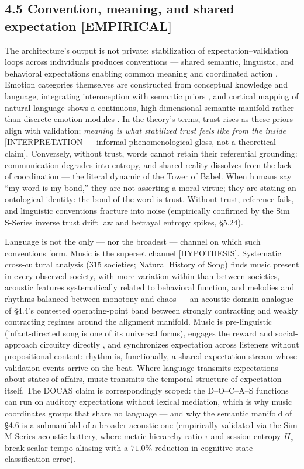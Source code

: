 \documentclass[
]{article}
\begin{document}
\subsection{4.5 Convention, meaning, and shared expectation
{[}EMPIRICAL{]}}\label{convention-meaning-and-shared-expectation-empirical}

The architecture's output is not private: stabilization of
expectation--validation loops across individuals produces conventions
--- shared semantic, linguistic, and behavioral expectations enabling
common meaning and coordinated action . Emotion categories themselves
are constructed from conceptual knowledge and language, integrating
interoception with semantic priors , and cortical mapping of natural
language shows a continuous, high-dimensional semantic manifold rather
than discrete emotion modules . In the theory's terms, trust rises as
these priors align with validation; \emph{meaning is what stabilized
trust feels like from the inside} {[}INTERPRETATION --- informal
phenomenological gloss, not a theoretical claim{]}. Conversely, without
trust, words cannot retain their referential grounding: communication
degrades into entropy, and shared reality dissolves from the lack of
coordination --- the literal dynamic of the Tower of Babel. When humans
say ``my word is my bond,'' they are not asserting a moral virtue; they
are stating an ontological identity: the bond of the word is trust.
Without trust, reference fails, and linguistic conventions fracture into
noise (empirically confirmed by the Sim S-Series inverse trust drift law
and betrayal entropy spikes, §5.24).

Language is not the only --- nor the broadest --- channel on which such
conventions form. Music is the superset channel {[}HYPOTHESIS{]}.
Systematic cross-cultural analysis (315 societies; Natural History of
Song) finds music present in every observed society, with more variation
within than between societies, acoustic features systematically related
to behavioral function, and melodies and rhythms balanced between
monotony and chaos --- an acoustic-domain analogue of §4.4's contested
operating-point band between strongly contracting and weakly contracting
regimes around the alignment manifold. Music is pre-linguistic
(infant-directed song is one of its universal forms), engages the reward
and social-approach circuitry directly , and synchronizes expectation
across listeners without propositional content: rhythm is, functionally,
a shared expectation stream whose validation events arrive on the beat.
Where language transmits expectations about states of affairs, music
transmits the temporal structure of expectation itself. The DOCAS claim
is correspondingly scoped: the D--O--C--A--S functions can run on
auditory expectations without lexical mediation, which is why music
coordinates groups that share no language --- and why the semantic
manifold of §4.6 is a submanifold of a broader acoustic one (empirically
validated via the Sim M-Series acoustic battery, where metric hierarchy
ratio \(\tau\) and session entropy \(H_s\) break scalar tempo aliasing
with a \(71.0\%\) reduction in cognitive state classification error).
\end{document}
